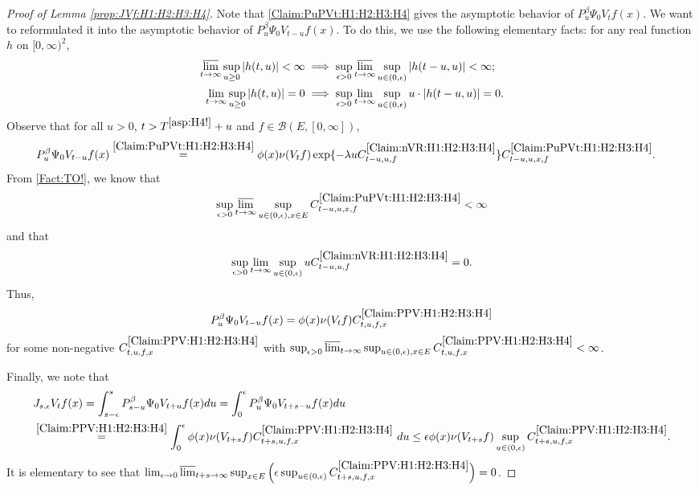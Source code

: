 \documentclass[12pt,a4paper]{amsart}
\numberwithin{equation}{section}
\theoremstyle{plain}
\theoremstyle{definition}
\theoremstyle{remark}
\begin{document}
\begin{proof}[Proof of Lemma \ref{prop:JVf:H1:H2:H3:H4}]
	Note that \eqref{Claim:PuPVt:H1:H2:H3:H4} gives the asymptotic behavior of $P_u^\beta \Psi_0 V_t f(x)$.
	We want to reformulated it into the asymptotic behavior  of $P_u^\beta \Psi_0 V_{t-u} f(x)$.	
	To do this, we use the following elementary facts: for any real function $h$ on $[0,\infty)^2$,
	\begin{align}\label{Fact:TO!}
	\varlimsup_{t\to \infty} \sup_{u\geq 0} |h(t,u)| < \infty & \implies \sup_{\epsilon > 0} \varlimsup_{t\to \infty} \sup_{u \in (0,\epsilon)} |h(t-u,u)| < \infty;
	\\ 	\lim_{t\to \infty} \sup_{u \geq 0} |h(t,u)| = 0 & \implies \sup_{\epsilon > 0} \lim_{t\to \infty} \sup_{u \in (0,\epsilon)} u\cdot |h(t-u,u)| = 0.
	\end{align}
	Observe that for all $u>0$, $t> T^{\eqref{asp:H4!}} + u$ and $f \in \mathcal B(E,[0,\infty])$,
	\begin{align}
	& P_u^\beta \Psi_0 V_{t-u} f(x)
	\overset{\eqref{Claim:PuPVt:H1:H2:H3:H4}}= \phi(x) \nu(V_{t}f) \exp\{-\lambda u C^{\eqref{Claim:nVR:H1:H2:H3:H4}}_{t-u,u,f} \} C^{\eqref{Claim:PuPVt:H1:H2:H3:H4}}_{t-u,u,x,f}.
	\end{align}
	From \eqref{Fact:TO!}, we know that
	\[
	\sup_{\epsilon > 0}\varlimsup_{t\to \infty} \sup_{u\in (0,\epsilon), x\in E} C^{\eqref{Claim:PuPVt:H1:H2:H3:H4}}_{t-u,u,x,f} < \infty
	\]
	and that
	\[
	\sup_{\epsilon > 0}\lim_{t\to \infty} \sup_{u\in (0,\epsilon)} uC^{\eqref{Claim:nVR:H1:H2:H3:H4}}_{t-u,u,f} =0.
	\]
	Thus,
\begin{equation}
	\label{Claim:PPV:H1:H2:H3:H4}
	P_u^\beta \Psi_0 V_{t-u} f(x) = \phi(x)\nu(V_tf) C^{\eqref{Claim:PPV:H1:H2:H3:H4}}_{t,u,f,x}
\end{equation}
	for some non-negative $C^{\eqref{Claim:PPV:H1:H2:H3:H4}}_{t, u,f,x}$ with $\sup_{\epsilon > 0} \varlimsup_{t\to \infty} \sup_{u \in (0,\epsilon), x\in E} C^{\eqref{Claim:PPV:H1:H2:H3:H4}}_{t,u,f,x} < \infty$.

	Finally, we note that
	\begin{align}
	&J_{s,\epsilon}V_tf(x) = \int_{s-\epsilon}^s P_{s-u}^\beta \Psi_0 V_{t+u} f(x)du
	= \int_0^\epsilon P_u^\beta \Psi_0 V_{t+s - u}f(x) du
	\\& \overset{\eqref{Claim:PPV:H1:H2:H3:H4}}= \int_0^\epsilon \phi(x) \nu(V_{t+s}f) C^{\eqref{Claim:PPV:H1:H2:H3:H4}}_{t+s,u,f,x}~du
	\leq \epsilon \phi(x)\nu(V_{t+s}f) \sup_{u\in (0,\epsilon)} C^{\eqref{Claim:PPV:H1:H2:H3:H4}}_{t+s,u,f,x}.
	\end{align}
	It is elementary to see that $\lim_{\epsilon \to 0}\varlimsup_{t+s \to \infty}\sup_{x\in E}\Big(\epsilon \sup_{u\in (0,\epsilon)} C^{\eqref{Claim:PPV:H1:H2:H3:H4}}_{t+s,u,f,x}\Big) = 0$.
\end{proof}
\end{document}
